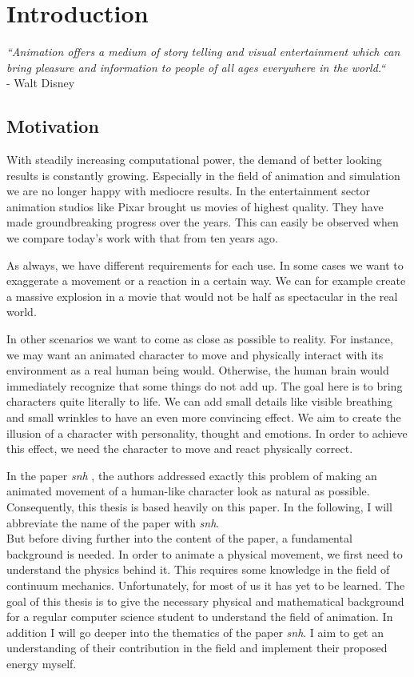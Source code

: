 \chapter{Introduction}
\textit{``Animation offers a medium of story telling and visual entertainment which can bring pleasure and information to people of all ages everywhere in the world.``} \\
- Walt Disney


\section{Motivation}
With steadily increasing computational power, the demand of better looking results is constantly growing. Especially in the field of animation and simulation we are no longer happy with mediocre results. 
In the entertainment sector animation studios like Pixar\textsuperscript{\textcopyright} brought us movies of highest quality. They have made groundbreaking progress over the years. This can easily be observed when we compare today's work with that from ten years ago. 

As always, we have different requirements for each use.
In some cases we want to exaggerate a movement or a reaction in a certain way. We can for example create a massive explosion in a movie that would not be half as spectacular in the real world. 

In other scenarios we want to come as close as possible to reality. For instance, we may want an animated character to move and physically interact with its environment as a real human being would. Otherwise, the human brain would immediately recognize that some things do not add up.
The goal here is to bring characters quite literally to life. We can add small details like visible breathing and small wrinkles to have an even more convincing effect. We aim to create the illusion of a character with personality, thought and emotions. In order to achieve this effect, we need the character to move and react physically correct. 

In the paper \textit{\acrlong{snh}} \cite{Smith:2018:SNF:3191713.3180491}, the authors addressed exactly this problem of making an animated movement of a human-like character look as natural as possible. Consequently, this thesis is based heavily on this paper. In the following, I will abbreviate the name of the paper with \textit{\acrshort{snh}}. \\
But before diving further into the content of the paper, a fundamental background is needed. In order to animate a physical movement, we first need to understand the physics behind it. This requires some knowledge in the field of continuum mechanics. Unfortunately, for most of us it has yet to be learned. The goal of this thesis is to give the necessary physical and mathematical background for a regular computer science student to understand the field of animation. In addition I will go deeper into the thematics of the paper \textit{\acrshort {snh}}. I aim to get an understanding of their contribution in the field and implement their proposed energy myself.


